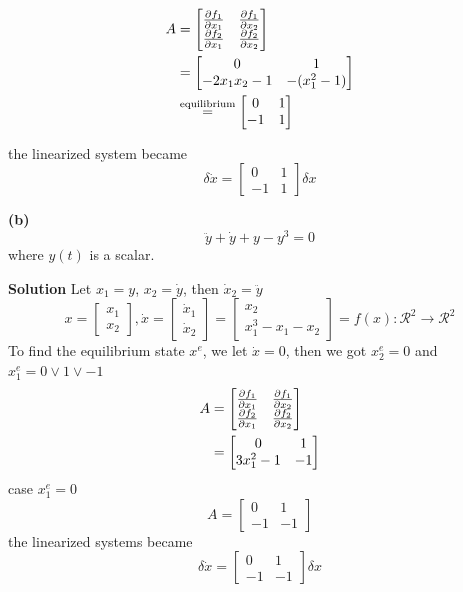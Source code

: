 \documentclass[12pt,a4paper]{article}
\begin{document}
\[
\begin{aligned}
A &= \begin{bmatrix}
		{\partial f_1 \over\partial x_1 } & {\partial f_1 \over\partial x_2 } \\
	{\partial f_2 \over\partial x_1 } & {\partial f_2 \over\partial x_2 }
\end{bmatrix} \\
&= \begin{bmatrix}
	0&  1\\
	-2x_1x_2 -1& -(x_1^2 - 1)
\end{bmatrix} \\
&\overset{\rm equilibrium}{=} \begin{bmatrix}
	0 & 1 \\ -1  &1
\end{bmatrix}
\end{aligned}
\]

the linearized system became \[
\delta \dot x = \begin{bmatrix}
	0 & 1 \\ -1 & 1
\end{bmatrix}\delta x
\]

\textbf{(b)}
\[\ddot y+\dot y+y-y^3=0\]
where $y(t)$ is a scalar.

\textbf{Solution}
Let $x_1 = y$, $x_2 = \dot y$, then $ \dot x_2 = \ddot y $
\[
x = \begin{bmatrix}
	x_1 \\ x_2
\end{bmatrix}, \dot x = \begin{bmatrix}
	\dot x_1 \\ \dot x_2
\end{bmatrix} = \begin{bmatrix}
	x_2 \\ x_1^3 - x_1 - x_2
\end{bmatrix} = f(x):\mathcal R^2 \to \mathcal R^2
\] 
To find the equilibrium state $x^e$, we let $\dot x = 0$, then we got $x_2^e = 0$ and $x_1^e = 0 \lor 1 \lor -1$
\[
\begin{aligned}
	A &= \begin{bmatrix}
		{\partial f_1 \over\partial x_1 } & {\partial f_1 \over\partial x_2 } \\
		{\partial f_2 \over\partial x_1 } & {\partial f_2 \over\partial x_2 }
	\end{bmatrix} \\
	&= \begin{bmatrix}
		0 & 1 \\
		3x_1^2 - 1 & -1
	\end{bmatrix}
\end{aligned}
\]
case $x_1^e = 0$
\[
A = \begin{bmatrix}
	0 & 1 \\ -1 & -1
\end{bmatrix}
\]
the linearized systems became
\[
\delta \dot x = \begin{bmatrix}
	0 & 1 \\ -1 & -1
\end{bmatrix} \delta x
\]
\end{document}
